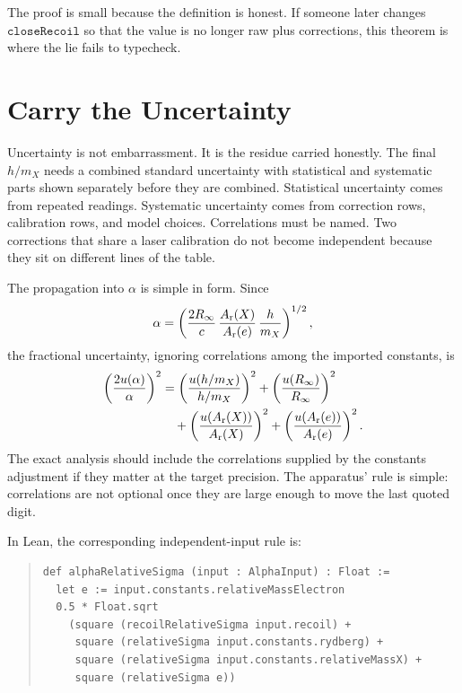 The proof is small because the definition is honest. If someone later changes \(\texttt{closeRecoil}\) so that
the value is no longer raw plus corrections, this theorem is where the lie fails to typecheck.

\section{Carry the Uncertainty}

Uncertainty is not embarrassment. It is the residue carried honestly. The final \(h/m_X\) needs a combined
standard uncertainty with statistical and systematic parts shown separately before they are combined. Statistical
uncertainty comes from repeated readings. Systematic uncertainty comes from correction rows, calibration rows,
and model choices. Correlations must be named. Two corrections that share a laser calibration do not become
independent because they sit on different lines of the table.

The propagation into \(\alpha\) is simple in form. Since
\[
  \alpha =
  \left(
  \frac{2R_\infty}{c}\,
  \frac{A_{\rm r}(X)}{A_{\rm r}(e)}\,
  \frac{h}{m_X}
  \right)^{1/2},
\]
the fractional uncertainty, ignoring correlations among the imported constants, is
\[
\begin{aligned}
  \left(\frac{2u(\alpha)}{\alpha}\right)^2
  &=
    \left(\frac{u(h/m_X)}{h/m_X}\right)^2
    +
    \left(\frac{u(R_\infty)}{R_\infty}\right)^2 \\
  &\quad+
    \left(\frac{u(A_{\rm r}(X))}{A_{\rm r}(X)}\right)^2
    +
    \left(\frac{u(A_{\rm r}(e))}{A_{\rm r}(e)}\right)^2 .
\end{aligned}
\]
The exact analysis should include the correlations supplied by the constants adjustment if they matter at the
target precision. The apparatus' rule is simple: correlations are not optional once they are large enough to
move the last quoted digit.

In Lean, the corresponding independent-input rule is:

\begin{quote}\small
\begin{verbatim}
def alphaRelativeSigma (input : AlphaInput) : Float :=
  let e := input.constants.relativeMassElectron
  0.5 * Float.sqrt
    (square (recoilRelativeSigma input.recoil) +
     square (relativeSigma input.constants.rydberg) +
     square (relativeSigma input.constants.relativeMassX) +
     square (relativeSigma e))
\end{verbatim}
\end{quote}

